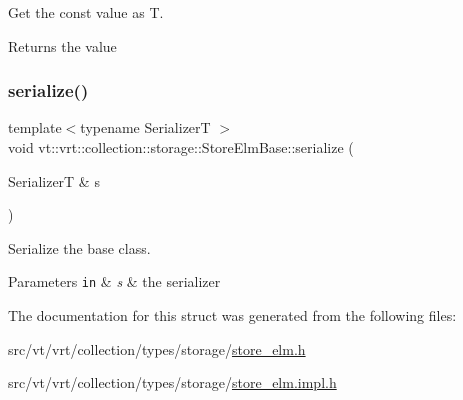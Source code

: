 Get the const value as {\ttfamily T}. 

\begin{DoxyReturn}{Returns}
the value 
\end{DoxyReturn}
\mbox{\label{structvt_1_1vrt_1_1collection_1_1storage_1_1_store_elm_base_a6552c32f1795ca501635036adc4e21d7}} 
\subsubsection{\texorpdfstring{serialize()}{serialize()}}
{\footnotesize\ttfamily template$<$typename SerializerT $>$ \\
void vt\+::vrt\+::collection\+::storage\+::\+Store\+Elm\+Base\+::serialize (\begin{DoxyParamCaption}\item[{SerializerT \&}]{s }\end{DoxyParamCaption})\hspace{0.3cm}{\ttfamily [inline]}}



Serialize the base class. 


\begin{DoxyParams}[1]{Parameters}
\mbox{\tt in}  & {\em s} & the serializer \\
\hline
\end{DoxyParams}


The documentation for this struct was generated from the following files\+:\begin{DoxyCompactItemize}
\item 
src/vt/vrt/collection/types/storage/\hyperlink{store__elm_8h}{store\+\_\+elm.\+h}\item 
src/vt/vrt/collection/types/storage/\hyperlink{store__elm_8impl_8h}{store\+\_\+elm.\+impl.\+h}\end{DoxyCompactItemize}
